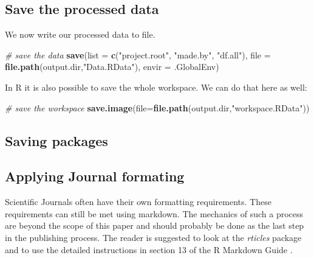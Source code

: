 \documentclass[10pt,]{article}
\newenvironment{Shaded}{\begin{snugshade}}{\end{snugshade}}
\newcommand{\CommentTok}[1]{\textcolor[rgb]{0.56,0.35,0.01}{\textit{#1}}}
\newcommand{\DataTypeTok}[1]{\textcolor[rgb]{0.13,0.29,0.53}{#1}}
\newcommand{\KeywordTok}[1]{\textcolor[rgb]{0.13,0.29,0.53}{\textbf{#1}}}
\newcommand{\NormalTok}[1]{#1}
\newcommand{\StringTok}[1]{\textcolor[rgb]{0.31,0.60,0.02}{#1}}
\begin{document}
\hypertarget{save-the-processed-data}{%
\subsection{Save the processed data}\label{save-the-processed-data}}

We now write our processed data to file.

\begin{Shaded}
\begin{Highlighting}[]
\CommentTok{# save the data}
\KeywordTok{save}\NormalTok{(}\DataTypeTok{list =} \KeywordTok{c}\NormalTok{(}\StringTok{"project.root"}\NormalTok{,}
              \StringTok{"made.by"}\NormalTok{,}
              \StringTok{"df.all"}\NormalTok{),}
       \DataTypeTok{file =} \KeywordTok{file.path}\NormalTok{(output.dir,}\StringTok{"Data.RData"}\NormalTok{),}
       \DataTypeTok{envir =}\NormalTok{ .GlobalEnv)}
\end{Highlighting}
\end{Shaded}

In R it is also possible to save the whole workspace. We can do that here as well:

\begin{Shaded}
\begin{Highlighting}[]
\CommentTok{# save the workspace}
\KeywordTok{save.image}\NormalTok{(}\DataTypeTok{file=}\KeywordTok{file.path}\NormalTok{(output.dir,}\StringTok{"workspace.RData"}\NormalTok{))}
\end{Highlighting}
\end{Shaded}

\hypertarget{saving-packages}{%
\subsection{Saving packages}\label{saving-packages}}

\hypertarget{applying-journal-formating}{%
\subsection{Applying Journal formating}\label{applying-journal-formating}}

Scientific Journals often have their own formatting requirements. These requirements can still be met using markdown. The mechanics of such a process are beyond the scope of this paper and should probably be done as the last step in the publishing process. The reader is suggested to look at the \emph{rticles} package and to use the detailed instructions in section 13 of the R Markdown Guide \citep{R-Markdown-Guide}.
\end{document}
